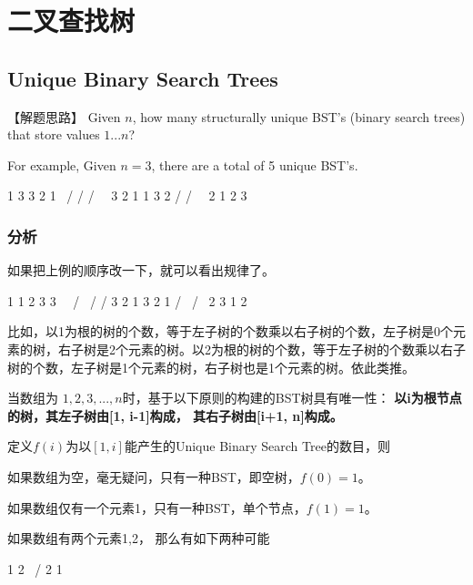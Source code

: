 \section{二叉查找树} %


\subsection{Unique Binary Search Trees}
\label{sec:unique-binary-search-trees}


【解题思路】
Given $n$, how many structurally unique BST's (binary search trees) that store values $1...n$?

For example,
Given $n = 3$, there are a total of 5 unique BST's.
\begin{Code}
	1         3     3      2      1
	\       /     /      / \      \
	3     2     1      1   3      2
	/     /       \                 \
	2     1         2                 3
\end{Code}

\subsubsection{分析}
如果把上例的顺序改一下，就可以看出规律了。
\begin{Code}
	1       1           2          3       3
	\       \         / \        /       / 
	3       2       1   3      2       1
	/         \                /         \
	2            3              1           2
\end{Code}

比如，以1为根的树的个数，等于左子树的个数乘以右子树的个数，左子树是0个元素的树，右子树是2个元素的树。以2为根的树的个数，等于左子树的个数乘以右子树的个数，左子树是1个元素的树，右子树也是1个元素的树。依此类推。

当数组为 $1,2,3,...,n$时，基于以下原则的构建的BST树具有唯一性：
\textbf{以i为根节点的树，其左子树由[1, i-1]构成， 其右子树由[i+1, n]构成。}

定义$f(i)$为以$[1,i]$能产生的Unique Binary Search Tree的数目，则

如果数组为空，毫无疑问，只有一种BST，即空树，$f(0)=1$。

如果数组仅有一个元素{1}，只有一种BST，单个节点，$f(1)=1$。

如果数组有两个元素{1,2}， 那么有如下两种可能
\begin{Code}
	1             2
	\          /
	2      1
\end{Code}

